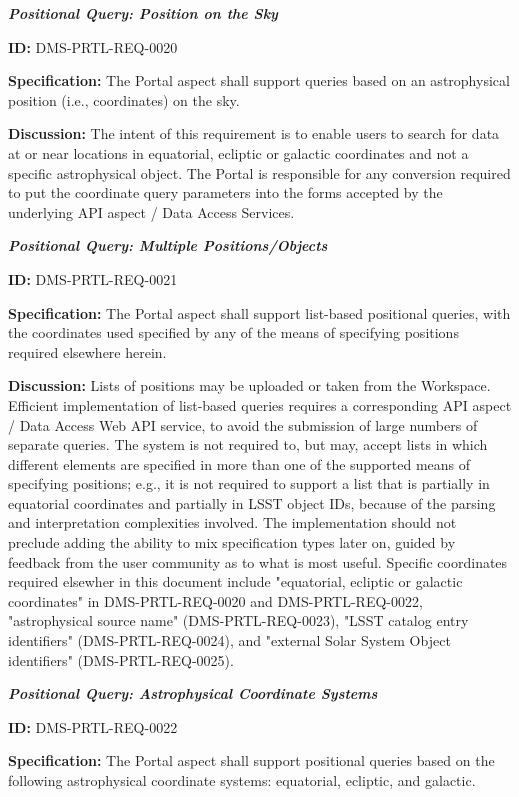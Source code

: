 \documentclass[SE,toc,lsstdraft]{lsstdoc}
\begin{document}
\textbf{\textit{Positional Query: Position on the Sky}}

\label{DMS-PRTL-REQ-0020}
\textbf{ID:} DMS-PRTL-REQ-0020

\textbf{Specification:}
The Portal aspect shall support queries based on an astrophysical position (i.e., coordinates) on the sky.

\textbf{Discussion:}
The intent of this requirement is to enable users to search for data at or near locations in equatorial, ecliptic or galactic coordinates and not a specific astrophysical object.
The Portal is responsible for any conversion required to put the coordinate query parameters into the forms accepted by the underlying API aspect / Data Access Services.

\textbf{\textit{Positional Query: Multiple Positions/Objects}}

\label{DMS-PRTL-REQ-0021}
\textbf{ID:} DMS-PRTL-REQ-0021

\textbf{Specification:}
The Portal aspect shall support list-based positional queries, with the coordinates used specified by any of the means of specifying positions required elsewhere herein.

\textbf{Discussion:}
Lists of positions may be uploaded or taken from the Workspace.  Efficient implementation of list-based queries requires a corresponding API aspect / Data Access Web API service, to avoid the submission of large numbers of separate queries.
The system is not required to, but may, accept lists in which different elements are specified in more than one of the supported means of specifying positions; e.g., it is not required to support a list that is partially in equatorial coordinates and partially in LSST object IDs, because of the parsing and interpretation complexities involved.  The implementation should not preclude adding the ability to mix specification types later on, guided by feedback from the user community as to what is most useful.
Specific coordinates required elsewher in this document include "equatorial, ecliptic or galactic coordinates" in DMS-PRTL-REQ-0020 and DMS-PRTL-REQ-0022, "astrophysical source name" (DMS-PRTL-REQ-0023), "LSST catalog entry identifiers" (DMS-PRTL-REQ-0024), and "external Solar System Object identifiers" (DMS-PRTL-REQ-0025).

\textbf{\textit{Positional Query: Astrophysical Coordinate Systems}}

\label{DMS-PRTL-REQ-0022}
\textbf{ID:} DMS-PRTL-REQ-0022

\textbf{Specification:}
The Portal aspect shall support positional queries based on the following astrophysical coordinate systems: equatorial, ecliptic, and galactic.
\end{document}
